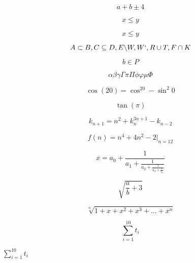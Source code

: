 \documentclass[12pt]{article}
\begin{document}
\begin{displaymath}
a + b \pm 4
\end{displaymath}

\begin{displaymath}
x \leqslant y %
\end{displaymath}

\begin{displaymath}
x \leq y
\end{displaymath}

\begin{displaymath}
A \subset B, C \subseteq D, E \backslash W, W`, R \cup T, F \cap K
\end{displaymath}

\begin{displaymath}
b \in P
\end{displaymath}

\begin{displaymath}
\alpha \beta \gamma \Gamma \pi \Pi \phi \varphi \mu \Phi
\end{displaymath}

\begin{displaymath}
\cos(20) = \cos^20 - \sin^2 0
\end{displaymath}

\begin{displaymath}
\tan(\pi)
\end{displaymath}

\begin{displaymath}
k_{n+1} = n^2 + k^{3n+1}_{n} - k_{n-2}
\end{displaymath}

\begin{displaymath}
f(n) = n^4 + 4n^2 - 2|_{n=12}
\end{displaymath}

\begin{displaymath}
x = a_0 + \frac{1}{a_1 + \frac{1}{a_2 + \frac{1}{a_3 + \frac{1}{a_4}}}}
\end{displaymath}

\begin{displaymath}
\sqrt{\frac{a}{b} + 3}
\end{displaymath}

\begin{displaymath}
\sqrt[n]{1 + x + x^2 + x^3 + ... + x^n}
\end{displaymath}

\begin{displaymath}
\sum^{10}_{i=1}t_i
\end{displaymath}


$\sum_{i=1}^{10}t_i$
\end{document}
